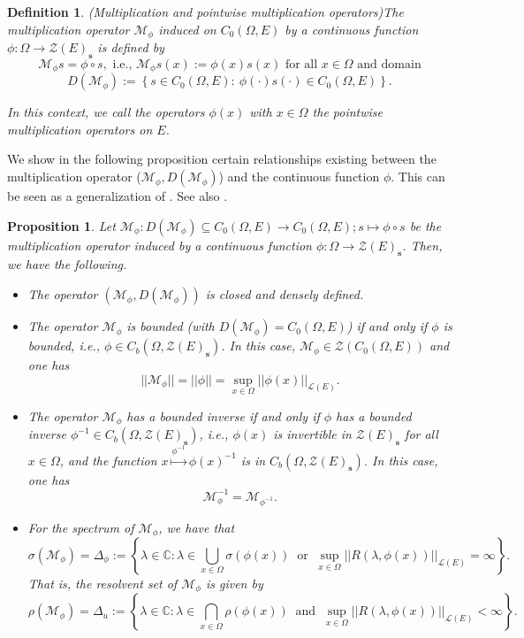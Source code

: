 \documentclass{article}
\newtheorem{defn}[equation]{Definition}
\newtheorem{prop}[equation]{Proposition}
\newcommand{\Bm}[1]{ \boldsymbol{ #1 }}
\newcommand{\C}{\mathbb{C}}
\newcommand{\sL}{\mathscr{L}}
\newcommand{\mZ}{\mathcal{Z}}
\newcommand{\mM}{\mathcal{M}}
\newcommand{\cc}{\circ}
\newcommand{\ty}{\infty}
\newcommand{\cd}{\cdot}
\newcommand{\lo}{\longrightarrow}
\newcommand{\sse}{\subseteq}
\newcommand{\la}{\lambda}
\newcommand{\sig}{\sigma}
\newcommand{\Om}{\Omega}
\newcommand{\mt}{\mapsto}
\newcommand{\lb}{\left\lbrace}
\newcommand{\rb}{\right\rbrace }
\newcommand{\bei}{\begin{itemize}}
\newcommand{\eei}{\end{itemize}}
\begin{document}
\begin{defn} (Multiplication and pointwise multiplication operators)\label{defn:mop1}
	The \textit{multiplication operator} $\mM_\phi $ induced on $C_0(\Om, E)$  by a  continuous function $\phi : \Om \lo  \Bm{\mZ}(E)_\textbf{s}$ is defined by
	\[\mM_\phi s=\phi \cc s,\text{ i.e., }\mM_\phi s(x):= \phi (x)s(x) \text{ for all } x\in \Om \text{ and domain}  \]
	\[ D(\mM_\phi):= \lb s\in C_0(\Om, E):\  \phi (\cd)s(\cd )\in C_0(\Om, E) \rb. \]
	
	
	In this context, we call the operators $\phi(x)$ with $x\in\Om$ the pointwise multiplication operators on $E$.
\end{defn}



We show in the following proposition certain relationships existing between the multiplication operator ($\mM_\phi,  D(\mM_\phi)$) and the continuous function $\phi$. This can be seen as a generalization of \cite[Chapter 1, Proposition 3.2, p.20-21]{engel2006short}.  See also  \cite[Proposition 2.3 \& Theorem 2.6, p.70]{Graser97}.


\begin{prop}\label{prop:mop1}
	Let $\mM_\phi : D(\mM_\phi)\sse C_0(\Om, E) \lo C_0(\Om, E); s \mt \phi\cc s$ be the multiplication operator induced by a continuous function $\phi : \Om \lo  \Bm{\mZ}(E)_\textbf{s}$. Then, we have the following.
	\bei	
	\item[(i)] The operator $(\mM_\phi,  D(\mM_\phi)  )$ is closed and densely defined.
	
	\item[(ii)] The operator $\mM_\phi$ is bounded (with $D(\mM_\phi) =C_0(\Om, E)$) if and only if $\phi$ is bounded, i.e., $\phi\in C_b(\Om, \Bm{\mZ}(E)_\textbf{s})$. In this case,  $\mM_\phi\in\Bm{\mZ} ( C_0(\Om, E))$ and one has
	$$||\mM_\phi||= ||\phi||= \sup_{x\in\Om}||\phi(x)||_{\sL(E)}.$$
	
	\item[(iii)] The operator $\mM_\phi$ has a bounded inverse if and only if $\phi$ has a bounded inverse $\phi^{-1}\in C_b(\Om, \Bm{\mZ}(E)_\textbf{s})$, i.e., $\phi(x)$ is invertible in $\Bm{\mZ}(E)_\textbf{s}$ for all $x\in\Om$, and the function $ x  \overset{\phi^{-1}}{\longmapsto}       \phi(x)^{-1}$ is in $C_b(\Om, \Bm{\mZ}(E)_\textbf{s})$.
	 In this case, one has
	\[  \mM_\phi^{-1}= \mM_{\phi^{-1} }.\]
	\item[(iv)] For the spectrum of $\mM_\phi$, we have that
		\[\sig(\mM_\phi)=  \Delta_\phi:=  \lb  \la\in\C :\la \in\bigcup_{x\in \Om}\sig(\phi(x)) \ \text{ or } \     \sup_{x\in\Om}|| R(\la, \phi(x))||_{\sL(E)}=\ty  \rb.\] 
	That is, the resolvent set of $\mM_\phi$ is given by 
	\[ \rho(\mM_\phi) = \Delta_u:= \lb \la\in\C : \la \in \bigcap_{x\in \Om} \rho(\phi(x)) \ \text{ and } \  \sup_{x\in\Om}|| R(\la, \phi(x))||_{\sL(E)}<\ty \rb.\]	
	\eei
\end{prop}
\end{document}

